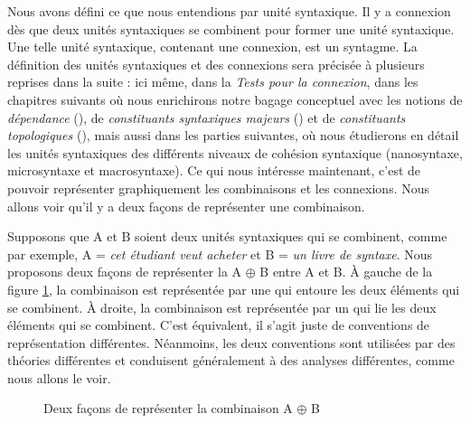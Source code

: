 Nous avons défini ce que nous entendions par unité syntaxique. Il y a connexion dès que deux unités syntaxiques se combinent pour former une unité syntaxique. Une telle unité syntaxique, contenant une connexion, est un syntagme. La définition des unités syntaxiques et des connexions sera précisée à plusieurs reprises dans la suite : ici même, dans la  \textit{Tests pour la connexion}, dans les chapitres suivants où nous enrichirons notre bagage conceptuel avec les notions de \textit{dépendance} (), de \textit{constituants syntaxiques majeurs} () et de \textit{constituants topologiques} (), mais aussi dans les parties suivantes, où nous étudierons en détail les unités syntaxiques des différents niveaux de cohésion syntaxique (nanosyntaxe, microsyntaxe et macrosyntaxe). Ce qui nous intéresse maintenant, c’est de pouvoir représenter graphiquement les combinaisons et les connexions. Nous allons voir qu’il y a deux façons de représenter une combinaison.

Supposons que A et B soient deux unités syntaxiques qui se combinent, comme par exemple, A = \textit{cet étudiant veut acheter} et B = \textit{un livre de syntaxe}. Nous proposons deux façons de représenter la  A ${\oplus}$ B entre A et B. À gauche de la figure \ref{fig:combiAB}, la combinaison est représentée par une  qui entoure les deux éléments qui se combinent. À droite, la combinaison est représentée par un  qui lie les deux éléments qui se combinent. C’est équivalent, il s’agit juste de conventions de représentation différentes. Néanmoins, les deux conventions sont utilisées par des théories différentes et conduisent généralement à des analyses différentes, comme nous allons le voir.

\begin{figure}
\caption{\label{fig:combiAB}Deux façons de représenter la combinaison A $\oplus$ B}
\end{figure}

